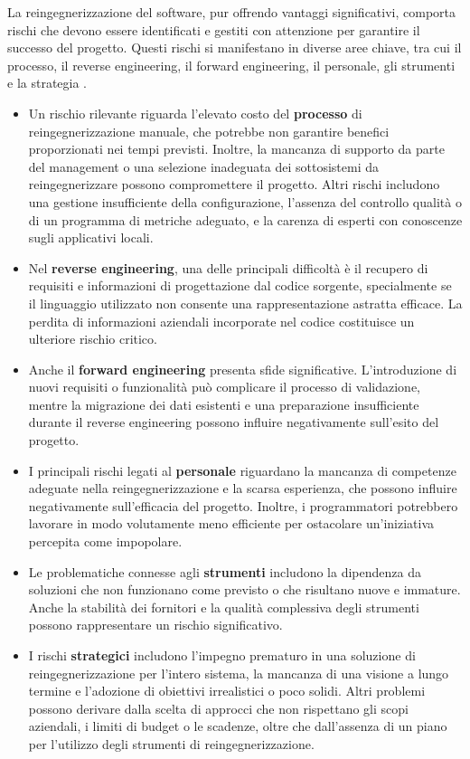 La reingegnerizzazione del software, pur offrendo vantaggi significativi, comporta rischi che devono essere identificati e gestiti con attenzione per garantire il successo del progetto. Questi rischi si manifestano in diverse aree chiave, tra cui il processo, il reverse engineering, il forward engineering, il personale, gli strumenti e la strategia \cite{rosenberg1996software}.
\begin{itemize}
  \item Un rischio rilevante riguarda l'elevato costo del \textbf{processo} di reingegnerizzazione manuale, che potrebbe non garantire benefici proporzionati nei tempi previsti. Inoltre, la mancanza di supporto da parte del management o una selezione inadeguata dei sottosistemi da reingegnerizzare possono compromettere il progetto. Altri rischi includono una gestione insufficiente della configurazione, l'assenza del controllo qualità o di un programma di metriche adeguato, e la carenza di esperti con conoscenze sugli applicativi locali.
  \item Nel \textbf{reverse engineering}, una delle principali difficoltà è il recupero di requisiti e informazioni di progettazione dal codice sorgente, specialmente se il linguaggio utilizzato non consente una rappresentazione astratta efficace. La perdita di informazioni aziendali incorporate nel codice costituisce un ulteriore rischio critico.
  \item Anche il \textbf{forward engineering} presenta sfide significative. L'introduzione di nuovi requisiti o funzionalità può complicare il processo di validazione, mentre la migrazione dei dati esistenti e una preparazione insufficiente durante il reverse engineering possono influire negativamente sull'esito del progetto.
  \item I principali rischi legati al \textbf{personale} riguardano la mancanza di competenze adeguate nella reingegnerizzazione e la scarsa esperienza, che possono influire negativamente sull'efficacia del progetto. Inoltre, i programmatori potrebbero lavorare in modo volutamente meno efficiente per ostacolare un'iniziativa percepita come impopolare.
  \item Le problematiche connesse agli \textbf{strumenti} includono la dipendenza da soluzioni che non funzionano come previsto o che risultano nuove e immature. Anche la stabilità dei fornitori e la qualità complessiva degli strumenti possono rappresentare un rischio significativo.
  \item  I rischi \textbf{strategici} includono l'impegno prematuro in una soluzione di reingegnerizzazione per l'intero sistema, la mancanza di una visione a lungo termine e l'adozione di obiettivi irrealistici o poco solidi. Altri problemi possono derivare dalla scelta di approcci che non rispettano gli scopi aziendali, i limiti di budget o le scadenze, oltre che dall'assenza di un piano per l'utilizzo degli strumenti di reingegnerizzazione.
\end{itemize}

